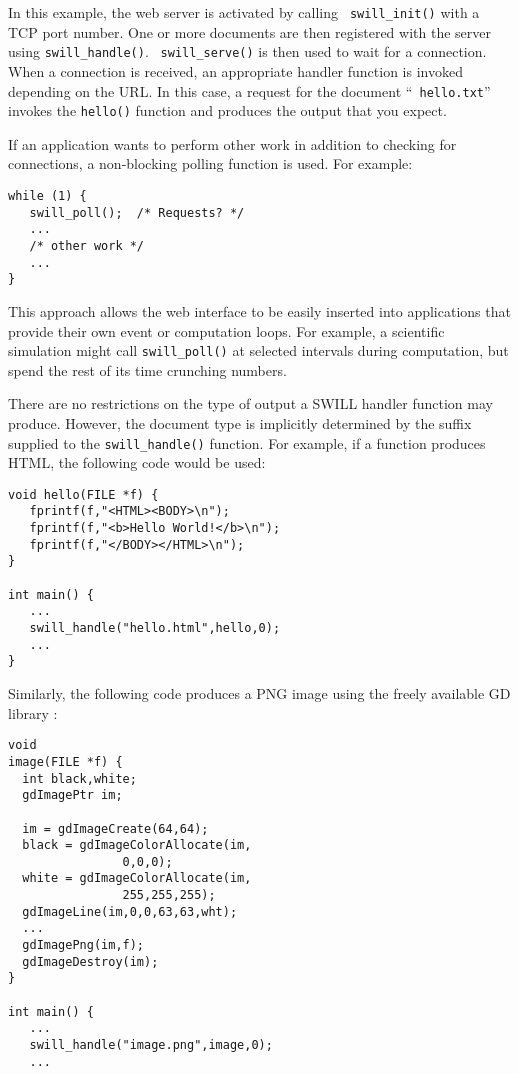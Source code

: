 In this example, the web server is activated by calling {\tt
swill\_init()} with a TCP port number.  One or more documents are then
registered with the server using {\tt swill\_handle()}.  {\tt
swill\_serve()} is then used to wait for a connection.  When a
connection is received, an appropriate handler function is invoked
depending on the URL. In this case, a request for the document ``{\tt
hello.txt}'' invokes the {\tt hello()} function and produces the
output that you expect.

If an application wants to perform other work in addition to checking
for connections, a non-blocking polling function is used.  
For example:

\begin{verbatim}
while (1) {
   swill_poll();  /* Requests? */
   ...
   /* other work */
   ...
}
\end{verbatim}

This approach allows the web interface to be easily inserted into
applications that provide their own event or computation loops.  
For example, a
scientific simulation might call {\tt swill\_poll()} at selected
intervals during computation, but spend the rest of its time crunching
numbers.

There are no restrictions on the type of output a SWILL handler
function may produce.  However, the document type is implicitly determined
by the suffix supplied to the {\tt swill\_handle()} function. For example,
if a function produces HTML, the following code would be used:

\begin{verbatim}
void hello(FILE *f) {
   fprintf(f,"<HTML><BODY>\n");
   fprintf(f,"<b>Hello World!</b>\n");
   fprintf(f,"</BODY></HTML>\n");
}

int main() {
   ...
   swill_handle("hello.html",hello,0);
   ...
}
\end{verbatim}

Similarly, the following code produces a PNG image using the freely available GD library \cite{gd}:

\begin{verbatim}
void
image(FILE *f) {
  int black,white;
  gdImagePtr im;
  
  im = gdImageCreate(64,64);
  black = gdImageColorAllocate(im,
                0,0,0);
  white = gdImageColorAllocate(im,
                255,255,255);
  gdImageLine(im,0,0,63,63,wht);
  ...
  gdImagePng(im,f);
  gdImageDestroy(im);
}

int main() {
   ...
   swill_handle("image.png",image,0);
   ...
\end{verbatim}

